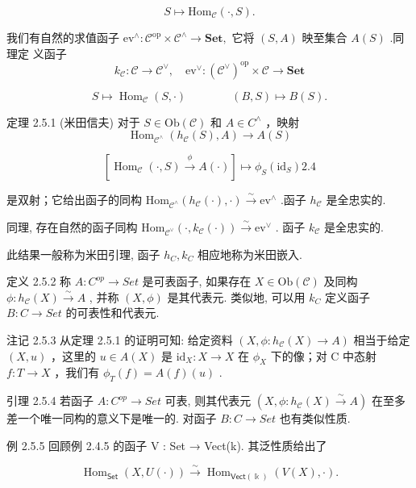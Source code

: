 \documentclass[]{article}
\begin{document}
$$
S \longmapsto \mathrm{Hom} _ {\mathcal {C}} (\cdot , S).
$$

我们有自然的求值函子 $\mathrm{ev}^{\wedge}:\mathcal{C}^{\mathrm{op}}\times \mathcal{C}^{\wedge}\to \mathbf{Set},$ 它将 $(S,A)$ 映至集合 $A(S)$ .同理定 义函子 $$
k _ {\mathcal {C}}: \mathcal {C} \longrightarrow \mathcal {C} ^ {\vee}, \quad \mathrm{ev} ^ {\vee}: (\mathcal {C} ^ {\vee}) ^ {\mathrm{op}} \times \mathcal {C} \longrightarrow \mathbf {S e t}
$$

$$
S \longmapsto \operatorname{Hom} _ {\mathcal {C}} (S, \cdot) \qquad \qquad (B, S) \longmapsto B (S).
$$

定理 2.5.1 (米田信夫) 对于 $S \in \mathrm{Ob}(\mathcal{C})$ 和 $A \in C^{\wedge}$ ，映射 $$
\operatorname{Hom} _ {\mathcal {C} ^ {\wedge}} (h _ {\mathcal {C}} (S), A) \longrightarrow A (S)
$$

$$
\left[ \operatorname{Hom} _ {\mathcal {C}} (\cdot , S) \xrightarrow {\phi} A (\cdot) \right] \longmapsto \phi_ {S} (\mathrm{id} _ {S})  {2.4}
$$

是双射；它给出函子的同构 $\mathrm{Hom}_{\mathcal{C}^{\wedge}}(h_{\mathcal{C}}(\cdot),\cdot)\stackrel {\sim}{\to}\mathrm{ev}^{\wedge}$ .函子 $h_{\mathcal{C}}$ 是全忠实的. 

同理, 存在自然的函子同构 $\mathrm{Hom}_{\mathcal{C}^{\vee}}(\cdot, k_{\mathcal{C}}(\cdot)) \xrightarrow{\sim} \mathrm{ev}^{\vee}$ . 函子 $k_{\mathcal{C}}$ 是全忠实的. 

此结果一般称为米田引理, 函子 $h_{C}, k_{C}$ 相应地称为米田嵌入. 

定义 2.5.2 称 $A: C^{op} \rightarrow Set$ 是可表函子, 如果存在 $X \in \mathrm{Ob}(\mathcal{C})$ 及同构 $\phi: h_{\mathcal{C}}(X) \stackrel{\sim}{\to} A$ , 并称 $(X, \phi)$ 是其代表元. 类似地, 可以用 $k_{C}$ 定义函子 $B: C \rightarrow Set$ 的可表性和代表元. 

注记 2.5.3 从定理 2.5.1 的证明可知: 给定资料 $(X, \phi : h_{\mathcal{C}}(X) \to A)$ 相当于给定 $(X, u)$ ，这里的 $u \in A(X)$ 是 $\mathrm{id}_{X} : X \to X$ 在 $\phi_{X}$ 下的像；对 C 中态射 $f : T \to X$ ，我们有 $\phi_{T}(f) = A(f)(u)$ . 

引理 2.5.4 若函子 $A: C^{op} \rightarrow Set$ 可表, 则其代表元 $(X, \phi: h_{\mathcal{C}}(X) \stackrel{\sim}{\to} A)$ 在至多差一个唯一同构的意义下是唯一的. 对函子 $B: C \rightarrow Set$ 也有类似性质. 

例 2.5.5 回顾例 2.4.5 的函子 V : Set → Vect(k). 其泛性质给出了 

$$
\operatorname{Hom} _ {\mathsf {S e t}} (X, U (\cdot)) \xrightarrow {\sim} \operatorname{Hom} _ {\mathsf {V e c t} (\Bbbk)} (V (X), \cdot).
$$
\end{document}
